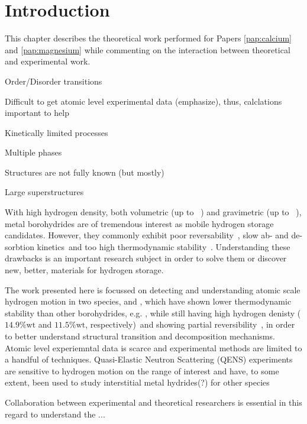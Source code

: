 \section{Introduction}
\label{sec:borohydrides-introduction}

This chapter describes the theoretical work performed for Papers \ref{pap:calcium} and \ref{pap:magnesium} while commenting on the interaction between theoretical and experimental work.

\bit
\item Order/Disorder transitions
\item Difficult to get atomic level experimental data (emphasize), thus, calclations important to help
\item Kinetically limited processes
\item Multiple phases
\item Structures are not fully known (but mostly)
\item Large superstructures
\eit

With high hydrogen density, both volumetric (up to \missing{}~\citemiss) and gravimetric (up to \missing{}~\citemiss), metal borohydrides are of tremendous interest as mobile hydrogen storage candidates.
However, they commonly exhibit poor reversability~\citemiss, slow ab- and de-sorbtion kinetics~\citemiss and too high thermodynamic stability~\citemiss.
Understanding these drawbacks is an important research subject in order to solve them or discover new, better, materials for hydrogen storage.

The work presented here is focussed on detecting and understanding atomic scale hydrogen motion in two species,  and , which have shown lower thermodynamic stability than other borohydrides, e.g. , while still having high hydrogen denisty ($14.9\%\text{wt}$ and $11.5\%\text{wt}$, respectively)~\citemiss and showing partial reversibility~\citemiss, in order to better understand structural transition and decomposition mechanisms.
Atomic level experiemntal data is scarce and experimental methods are limited to a handful of techniques.
Quasi-Elastic Neutron Scattering (QENS) experiments are sensitive to hydrogen motion on the range of interest and have, to some extent, been used to study interstitial metal hydrides(?) for other species

Collaboration between experimental and theoretical researchers is essential in this regard to understand the ...

